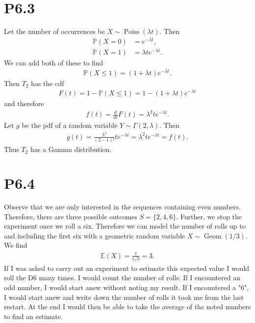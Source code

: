 \documentclass{article}
\renewcommand{\P}{\mathbb{P}}
\newcommand{\E}{\mathbb{E}}
\DeclareMathOperator{\Geom}{Geom}
\DeclareMathOperator{\Poiss}{Poiss}
\begin{document}
\section*{P6.3}
Let the number of occurrences be $X\sim\Poiss(\lambda t)$. Then
\begin{align*}
  \P(X=0)&=e^{-\lambda t},\\
  \P(X=1)&=\lambda te^{-\lambda t}.
\end{align*} 
We can add both of these to find
\begin{align*}
  \P(X\leq 1) = (1+\lambda t)e^{-\lambda t}.
\end{align*}
Then $T_2$ has the cdf
\begin{align*}
  F(t) = 1 - \P(X\leq 1) = 1-(1+\lambda t)e^{-\lambda t}
\end{align*}
and therefore
\begin{align*}
  f(t) = \frac{d}{dt}F(t) = \lambda^2te^{-\lambda t}.
\end{align*}
Let $g$ be the pdf of a random variable $Y\sim\Gamma(2,\lambda)$. Then
\begin{align*}
  g(t) = \frac{\lambda^2}{(2-1)!}te^{-\lambda t} = \lambda^2te^{-\lambda t} = f(t).
\end{align*}
Thus $T_2$ has a Gamma distribution.
\section*{P6.4}
Observe that we are only interested in the sequences containing even numbers.
Therefore, there are three possible outcomes $S=\{2,4,6\}$. Further,
we stop the experiment once we roll a six. Therefore we can model the 
number of rolls up to and including the first six with a geometric random
variable $X\sim\Geom(1/3)$. We find
\begin{align*}
  \E(X)=\frac{1}{1/3} = 3.
\end{align*}
If I was asked to carry out an experiment to estimate this expected value
I would roll the D6 many times. I would count the number of rolls. If I
encountered an odd number, I would start anew without noting my result.
If I encountered a "6", I would start anew and write down the number of
rolls it took me from the last restart. At the end I would then be able
to take the average of the noted numbers to find an estimate.
\end{document}
